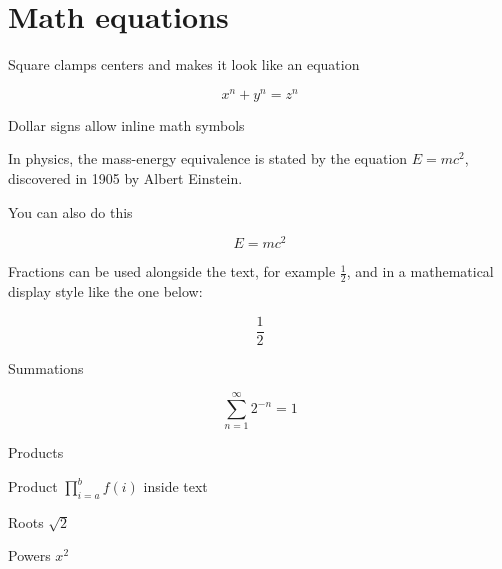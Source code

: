 \documentclass[a4paper,12pt]{article}
\begin{document}
\clearpage
\section{Math equations}

 Square clamps centers and makes it look like an equation

\[ x^n + y^n = z^n \]

Dollar signs allow inline math symbols

In physics, the mass-energy equivalence is stated 
by the equation $E=mc^2$, discovered in 1905 by Albert Einstein\cite{einstein}.

You can also do this

\begin{equation}
E=mc^2
\end{equation}

Fractions can be used alongside the text, for 
example \( \frac{1}{2} \), and in a mathematical 
display style like the one below\cite{dirac}:

\[\frac{1}{2}\]

Summations

\[ \sum_{n=1}^{\infty} 2^{-n} = 1 \]

Products\cite{knuthwebsite}

Product $\prod_{i=a}^{b} f(i)$ inside text

Roots
$\sqrt{2}$

Powers $x^2$


\printbibliography
\end{document}
